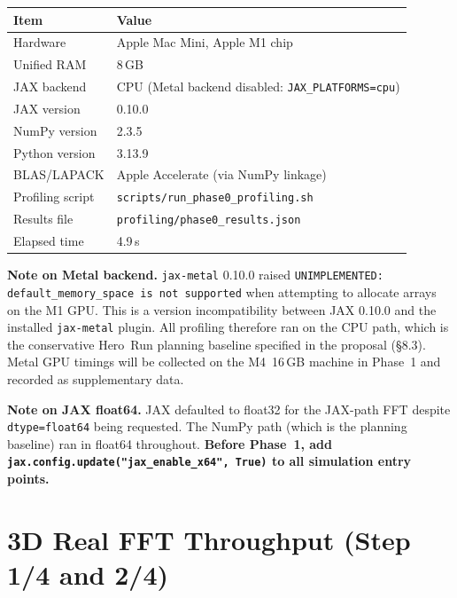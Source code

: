 \documentclass[11pt, a4paper]{article}
\begin{document}
\begin{center}
\begin{tabular}{ll}
\toprule
Item & Value \\
\midrule
Hardware & Apple Mac Mini, Apple M1 chip \\
Unified RAM & 8\,GB \\
JAX backend & CPU (Metal backend disabled: \texttt{JAX\_PLATFORMS=cpu}) \\
JAX version & 0.10.0 \\
NumPy version & 2.3.5 \\
Python version & 3.13.9 \\
BLAS/LAPACK & Apple Accelerate (via NumPy linkage) \\
Profiling script & \texttt{scripts/run\_phase0\_profiling.sh} \\
Results file & \texttt{profiling/phase0\_results.json} \\
Elapsed time & 4.9\,s \\
\bottomrule
\end{tabular}
\end{center}

\begin{notebox}
\textbf{Note on Metal backend.}
\texttt{jax-metal} 0.10.0 raised \texttt{UNIMPLEMENTED: default\_memory\_space
is not supported} when attempting to allocate arrays on the M1 GPU.
This is a version incompatibility between JAX 0.10.0 and the installed
\texttt{jax-metal} plugin.  All profiling therefore ran on the CPU path,
which is the conservative Hero~Run planning baseline specified in the
proposal (\S8.3).  Metal GPU timings will be collected on the M4~16\,GB
machine in Phase~1 and recorded as supplementary data.
\end{notebox}

\begin{notebox}
\textbf{Note on JAX float64.}
JAX defaulted to float32 for the JAX-path FFT despite \texttt{dtype=float64}
being requested.  The NumPy path (which is the planning baseline) ran in
float64 throughout.  \textbf{Before Phase~1, add
\texttt{jax.config.update("jax\_enable\_x64", True)} to all simulation
entry points.}
\end{notebox}

\section{3D Real FFT Throughput (Step 1/4 and 2/4)}
\label{sec:fft}
\end{document}
